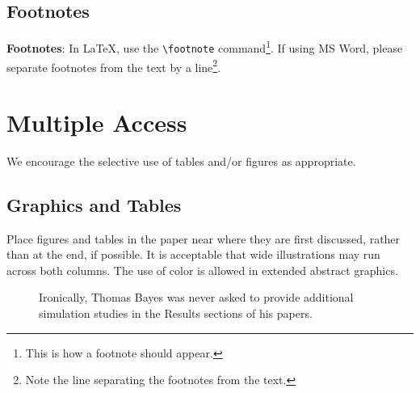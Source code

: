 \documentclass[10pt]{article}
\begin{document}
\subsection{Footnotes}

{\bf Footnotes}: In \LaTeX, use the \verb+\footnote+
command\footnote{This is how a footnote should appear.}. If using
MS Word, please separate footnotes
from the text by a line\footnote{Note the line
  separating the footnotes from the text.}.

\section{Multiple Access}

We encourage the selective use of tables and/or figures as appropriate.

\subsection{Graphics and Tables}

Place figures and tables in the
paper near where they are first discussed, rather than at the end, if
possible.  It is acceptable that wide illustrations
may run across both columns.  The use of color
is allowed in extended abstract graphics.

\begin{figure}[ht]
  \begin{center}
    \caption{Ironically, Thomas Bayes was never asked to provide additional
      simulation studies in the Results sections of his papers.}
    \label{bayespic}
  \end{center}
\end{figure}
\end{document}
